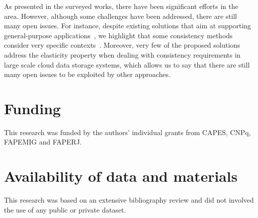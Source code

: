 As presented in the surveyed works, there have been significant efforts in the area. However, although some challenges have been addressed, there are still many open issues. For instance, despite existing solutions that aim at supporting gen\-eral-purpose applications~\cite{BrandenburgerCK15,esteves2012quality,liu2014consistency,MukundanML12}, we highlight that some consistency methods consider very specific contexts~\cite{balegas2015putting,Chen:2014,chihoub2012harmony,cooper2008pnuts,Corbett:2013,Du2013,sivasubramanian2012amazon,Terry:2013}. Moreover, very few of the proposed solutions~\cite{Chen:2014,chihoub2012harmony,sivasubramanian2012amazon} address the elasticity property when dealing with consistency requirements in large scale cloud data storage systems, which allows us to say that there are still many open issues to be exploited by other approaches.


\vspace{-5mm}
\section*{Funding}
\noindent
This research was funded by the authors' individual grants from CAPES, CNPq, FAPEMIG and FAPERJ. 

\vspace{-5mm}
\section*{Availability of data and materials}
\noindent
This research was based on an extensive bibliography review and did not involved the use of any public or private dataset.

